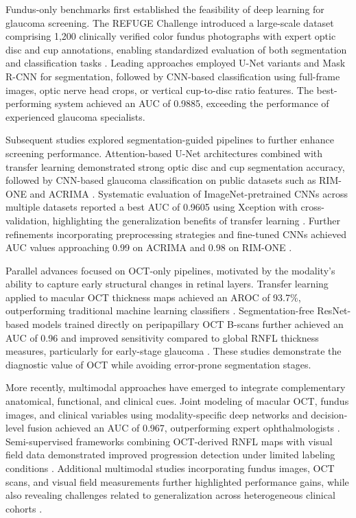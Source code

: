 \documentclass[preprint,12pt]{elsarticle}
\begin{document}
Fundus-only benchmarks first established the feasibility of deep learning for glaucoma screening\cite{shyamalee2024automated}. The REFUGE Challenge introduced a large-scale dataset comprising 1,200 clinically verified color fundus photographs with expert optic disc and cup annotations, enabling standardized evaluation of both segmentation and classification tasks \cite{orlando2020refuge}. Leading approaches employed U-Net variants and Mask R-CNN for segmentation, followed by CNN-based classification using full-frame images, optic nerve head crops, or vertical cup-to-disc ratio features. The best-performing system achieved an AUC of 0.9885, exceeding the performance of experienced glaucoma specialists.

Subsequent studies explored segmentation-guided pipelines to further enhance screening performance. Attention-based U-Net architectures combined with transfer learning demonstrated strong optic disc and cup segmentation accuracy, followed by CNN-based glaucoma classification on public datasets such as RIM-ONE and ACRIMA \cite{shyamalee2022glaucoma}. Systematic evaluation of ImageNet-pretrained CNNs across multiple datasets reported a best AUC of 0.9605 using Xception with cross-validation, highlighting the generalization benefits of transfer learning \cite{diaz2019cnns}. Further refinements incorporating preprocessing strategies and fine-tuned CNNs achieved AUC values approaching 0.99 on ACRIMA and 0.98 on RIM-ONE \cite{shyamalee2022cnn}.

Parallel advances focused on OCT-only pipelines, motivated by the modality's ability to capture early structural changes in retinal layers. Transfer learning applied to macular OCT thickness maps achieved an AROC of 93.7\%, outperforming traditional machine learning classifiers \cite{asaoka2019using}. Segmentation-free ResNet-based models trained directly on peripapillary OCT B-scans further achieved an AUC of 0.96 and improved sensitivity compared to global RNFL thickness measures, particularly for early-stage glaucoma \cite{thompson2020assessment}. These studies demonstrate the diagnostic value of OCT while avoiding error-prone segmentation stages.

More recently, multimodal approaches have emerged to integrate complementary anatomical, functional, and clinical cues. Joint modeling of macular OCT, fundus images, and clinical variables using modality-specific deep networks and decision-level fusion achieved an AUC of 0.967, outperforming expert ophthalmologists \cite{mehta2021automated}. Semi-supervised frameworks combining OCT-derived RNFL maps with visual field data demonstrated improved progression detection under limited labeling conditions \cite{luo2023harvard}. Additional multimodal studies incorporating fundus images, OCT scans, and visual field measurements further highlighted performance gains, while also revealing challenges related to generalization across heterogeneous clinical cohorts \cite{hwang2025utilization,lim2022use}.
\end{document}
